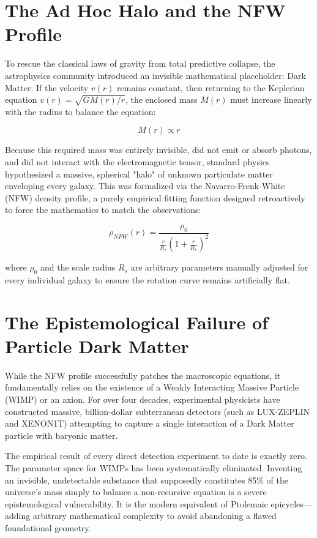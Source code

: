 \documentclass[12pt,openany]{book}
\begin{document}
\section{The Ad Hoc Halo and the NFW Profile}
To rescue the classical laws of gravity from total predictive collapse, the astrophysics community introduced an invisible mathematical placeholder: Dark Matter. If the velocity $v(r)$ remains constant, then returning to the Keplerian equation $v(r) = \sqrt{GM(r)/r}$, the enclosed mass $M(r)$ must increase linearly with the radius to balance the equation:

\begin{equation}
M(r) \propto r
\end{equation}

Because this required mass was entirely invisible, did not emit or absorb photons, and did not interact with the electromagnetic tensor, standard physics hypothesized a massive, spherical "halo" of unknown particulate matter enveloping every galaxy. This was formalized via the Navarro-Frenk-White (NFW) density profile, a purely empirical fitting function designed retroactively to force the mathematics to match the observations:

\begin{equation}
\rho_{NFW}(r) = \frac{\rho_0}{\frac{r}{R_s} \left(1 + \frac{r}{R_s}\right)^2}
\end{equation}

where $\rho_0$ and the scale radius $R_s$ are arbitrary parameters manually adjusted for every individual galaxy to ensure the rotation curve remains artificially flat.

\section{The Epistemological Failure of Particle Dark Matter}
While the NFW profile successfully patches the macroscopic equations, it fundamentally relies on the existence of a Weakly Interacting Massive Particle (WIMP) or an axion. For over four decades, experimental physicists have constructed massive, billion-dollar subterranean detectors (such as LUX-ZEPLIN and XENON1T) attempting to capture a single interaction of a Dark Matter particle with baryonic matter.

The empirical result of every direct detection experiment to date is exactly zero. The parameter space for WIMPs has been systematically eliminated. Inventing an invisible, undetectable substance that supposedly constitutes 85\% of the universe's mass simply to balance a non-recursive equation is a severe epistemological vulnerability. It is the modern equivalent of Ptolemaic epicycles---adding arbitrary mathematical complexity to avoid abandoning a flawed foundational geometry.
\end{document}

